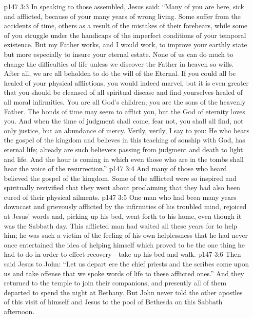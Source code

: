 \vs p147 3:3 In speaking to those assembled, Jesus said: \textcolor{ubdarkred}{“Many of you are here, sick and afflicted, because of your many years of wrong living. Some suffer from the accidents of time, others as a result of the mistakes of their forebears, while some of you struggle under the handicaps of the imperfect conditions of your temporal existence. But my Father works, and I would work, to improve your earthly state but more especially to insure your eternal estate. None of us can do much to change the difficulties of life unless we discover the Father in heaven so wills. After all, we are all beholden to do the will of the Eternal. If you could all be healed of your physical afflictions, you would indeed marvel, but it is even greater that you should be cleansed of all spiritual disease and find yourselves healed of all moral infirmities. You are all God’s children; you are the sons of the heavenly Father. The bonds of time may seem to afflict you, but the God of eternity loves you. And when the time of judgment shall come, fear not, you shall all find, not only justice, but an abundance of mercy. Verily, verily, I say to you: He who hears the gospel of the kingdom and believes in this teaching of sonship with God, has eternal life; already are such believers passing from judgment and death to light and life. And the hour is coming in which even those who are in the tombs shall hear the voice of the resurrection.”}
\vs p147 3:4 And many of those who heard believed the gospel of the kingdom. Some of the afflicted were so inspired and spiritually revivified that they went about proclaiming that they had also been cured of their physical ailments.
\vs p147 3:5 One man who had been many years downcast and grievously afflicted by the infirmities of his troubled mind, rejoiced at Jesus’ words and, picking up his bed, went forth to his home, even though it was the Sabbath day. This afflicted man had waited all these years for  to help him; he was such a victim of the feeling of his own helplessness that he had never once entertained the idea of helping himself which proved to be the one thing he had to do in order to effect recovery---take up his bed and walk.
\vs p147 3:6 Then said Jesus to John: \textcolor{ubdarkred}{“Let us depart ere the chief priests and the scribes come upon us and take offense that we spoke words of life to these afflicted ones.”} And they returned to the temple to join their companions, and presently all of them departed to spend the night at Bethany. But John never told the other apostles of this visit of himself and Jesus to the pool of Bethesda on this Sabbath afternoon.
